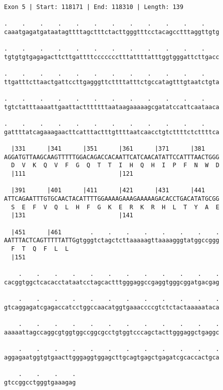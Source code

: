 \documentclass{article}
\begin{document}
\begin{Verbatim}
Exon 5 | Start: 118171 | End: 118310 | Length: 139
 
.    .    .    .    .    .    .    .    .    .    .    .    
caaatgagatgataatagttttagctttctacttgggtttcctacagcctttaggttgtg
  
.    .    .    .    .    .    .    .    .    .    .    .    
tgtgtgtgagagacttcttgattttccccccctttattttatttggtgggattcttgacc
  
.    .    .    .    .    .    .    .    .    .    .    .    
ttgatttcttaactgattccttgagggttcttttatttctgccatagtttgtaatctgta
  
.    .    .    .    .    .    .    .    .    .    .    .    
tgtctatttaaaattgaattactttttttaataagaaaaagcgatatccattcaataaca
  
.    .    .    .    .    .    .    .    .    .    .    .    
gattttatcagaaagaacttcatttactttgttttaatcaacctgtcttttctcttttca
  
  |331      |341      |351      |361      |371      |381    
AGGATGTTAAGCAAGTTTTTGGACAGACCACAATTCATCAACATATTCCATTTAACTGGG
  D  V  K  Q  V  F  G  Q  T  T  I  H  Q  H  I  P  F  N  W  D
  |111                          |121                        
  
  |391      |401      |411      |421      |431      |441    
ATTCAGAATTTGTGCAACTACATTTTGGAAAAGAAAGAAAAAGACACCTGACATATGCGG
  S  E  F  V  Q  L  H  F  G  K  E  R  K  R  H  L  T  Y  A  E
  |131                          |141                        
  
  |451      |461        .    .    .    .    .    .    .    .
AATTTACTCAGTTTTTATTGgtgggtctagctcttaaaaagttaaaagggtatggccggg
  F  T  Q  F  L  L                                          
  |151                                                      
  
    .    .    .    .    .    .    .    .    .    .    .    .
cacggtggctcacacctataatcctagcactttgggaggccgaggtgggcggatgacgag
  
    .    .    .    .    .    .    .    .    .    .    .    .
gtcaggagatcgagaccatcctggccaacatggtgaaaccccgtctctactaaaaataca
  
    .    .    .    .    .    .    .    .    .    .    .    .
aaaaattagccaggcgtggtggccggcgcctgtggtcccagctacttgggaggctgaggc
  
    .    .    .    .    .    .    .    .    .    .    .    .
aggagaatggtgtgaacttgggaggtggagcttgcagtgagctgagatcgcaccactgca
  
    .    .    .    .
gtccggcctgggtgaaagag
\end{Verbatim}
\newpage
\end{document}
